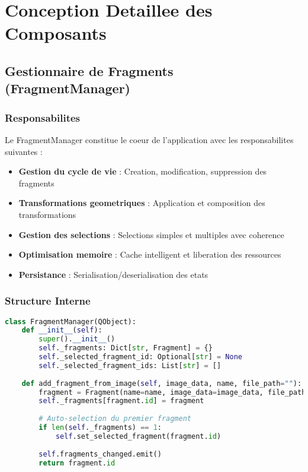 \documentclass[12pt,a4paper]{article}
\begin{document}
\section{Conception Detaillee des Composants}

\subsection{Gestionnaire de Fragments (FragmentManager)}

\subsubsection{Responsabilites}

Le FragmentManager constitue le coeur de l'application avec les responsabilites suivantes :

\begin{itemize}
\item \textbf{Gestion du cycle de vie} : Creation, modification, suppression des fragments
\item \textbf{Transformations geometriques} : Application et composition des transformations
\item \textbf{Gestion des selections} : Selections simples et multiples avec coherence
\item \textbf{Optimisation memoire} : Cache intelligent et liberation des ressources
\item \textbf{Persistance} : Serialisation/deserialisation des etats
\end{itemize}

\subsubsection{Structure Interne}

\begin{lstlisting}[language=Python]
class FragmentManager(QObject):
    def __init__(self):
        super().__init__()
        self._fragments: Dict[str, Fragment] = {}
        self._selected_fragment_id: Optional[str] = None
        self._selected_fragment_ids: List[str] = []
        
    def add_fragment_from_image(self, image_data, name, file_path=""):
        fragment = Fragment(name=name, image_data=image_data, file_path=file_path)
        self._fragments[fragment.id] = fragment
        
        # Auto-selection du premier fragment
        if len(self._fragments) == 1:
            self.set_selected_fragment(fragment.id)
        
        self.fragments_changed.emit()
        return fragment.id
\end{lstlisting}
\end{document}
